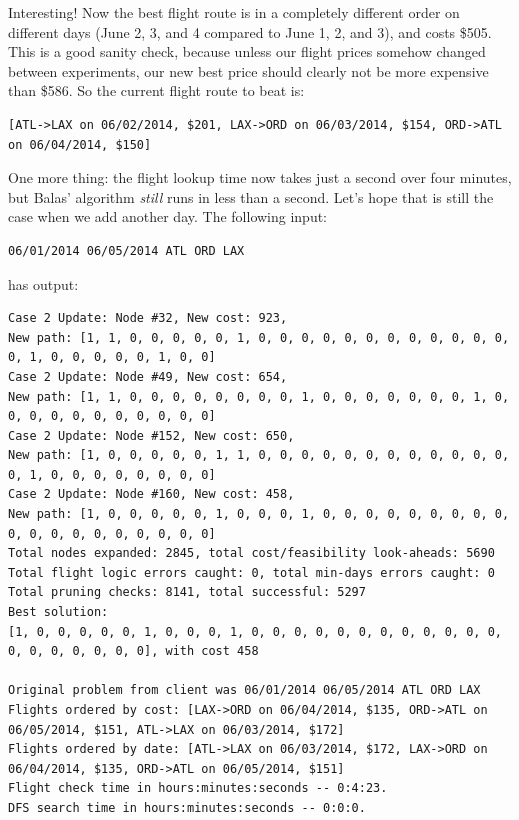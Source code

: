 \documentclass{article}
\begin{document}
Interesting! Now the best flight route is in a completely different order on different days (June 2, 3, and 4 compared to June 1, 2, and 3), and costs
\$505. This is a good sanity check, because unless our flight prices somehow changed between experiments, our new best price should clearly not be
more expensive than \$586. So the current flight route to beat is:

\footnotesize
\begin{verbatim}
[ATL->LAX on 06/02/2014, $201, LAX->ORD on 06/03/2014, $154, ORD->ATL on 06/04/2014, $150]
\end{verbatim}
\normalsize

One more thing: the flight lookup time now takes just a second over four minutes, but Balas' algorithm \emph{still} runs in less than a second. Let's
hope that is still the case when we add another day. The following input:

\begin{verbatim}
06/01/2014 06/05/2014 ATL ORD LAX
\end{verbatim}

has output:

\scriptsize
\begin{verbatim}
Case 2 Update: Node #32, New cost: 923, 
New path: [1, 1, 0, 0, 0, 0, 0, 1, 0, 0, 0, 0, 0, 0, 0, 0, 0, 0, 0, 0, 0, 1, 0, 0, 0, 0, 0, 1, 0, 0]
Case 2 Update: Node #49, New cost: 654, 
New path: [1, 1, 0, 0, 0, 0, 0, 0, 0, 0, 1, 0, 0, 0, 0, 0, 0, 0, 1, 0, 0, 0, 0, 0, 0, 0, 0, 0, 0, 0]
Case 2 Update: Node #152, New cost: 650, 
New path: [1, 0, 0, 0, 0, 0, 1, 1, 0, 0, 0, 0, 0, 0, 0, 0, 0, 0, 0, 0, 0, 1, 0, 0, 0, 0, 0, 0, 0, 0]
Case 2 Update: Node #160, New cost: 458, 
New path: [1, 0, 0, 0, 0, 0, 1, 0, 0, 0, 1, 0, 0, 0, 0, 0, 0, 0, 0, 0, 0, 0, 0, 0, 0, 0, 0, 0, 0, 0]
Total nodes expanded: 2845, total cost/feasibility look-aheads: 5690
Total flight logic errors caught: 0, total min-days errors caught: 0
Total pruning checks: 8141, total successful: 5297
Best solution:
[1, 0, 0, 0, 0, 0, 1, 0, 0, 0, 1, 0, 0, 0, 0, 0, 0, 0, 0, 0, 0, 0, 0, 0, 0, 0, 0, 0, 0, 0], with cost 458

Original problem from client was 06/01/2014 06/05/2014 ATL ORD LAX
Flights ordered by cost: [LAX->ORD on 06/04/2014, $135, ORD->ATL on 06/05/2014, $151, ATL->LAX on 06/03/2014, $172]
Flights ordered by date: [ATL->LAX on 06/03/2014, $172, LAX->ORD on 06/04/2014, $135, ORD->ATL on 06/05/2014, $151]
Flight check time in hours:minutes:seconds -- 0:4:23.
DFS search time in hours:minutes:seconds -- 0:0:0.
\end{verbatim}
\normalsize
\end{document}
